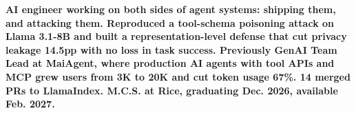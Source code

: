 \item\small{\textbf{AI engineer working on both sides of agent systems: shipping them, and attacking them. Reproduced a tool-schema poisoning attack on Llama 3.1-8B and built a representation-level defense that cut privacy leakage \textbf{14.5pp} with no loss in task success. Previously GenAI Team Lead at MaiAgent, where production AI agents with tool APIs and \textbf{MCP} grew users from \textbf{3K to 20K} and cut token usage \textbf{67\%}. \textbf{14} merged PRs to LlamaIndex. M.C.S. at Rice, graduating Dec. 2026, available Feb. 2027.}}%
